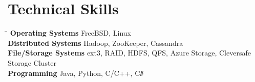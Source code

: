 \documentclass[10pt]{article} %
\begin{document}

\section{Technical Skills}

\begin{tabbing}
\hspace{4cm} \= \kill
\textbf{Operating Systems} \> FreeBSD, Linux \\
\textbf{Distributed Systems} \> Hadoop, ZooKeeper, Cassandra \\
\textbf{File/Storage Systems} \> ext3, RAID, HDFS, QFS, Azure Storage, Cleversafe Storage Cluster\\
\textbf{Programming} \> Java, Python, C/C++, C\texttt{\#}
\end{tabbing}
\end{document}
